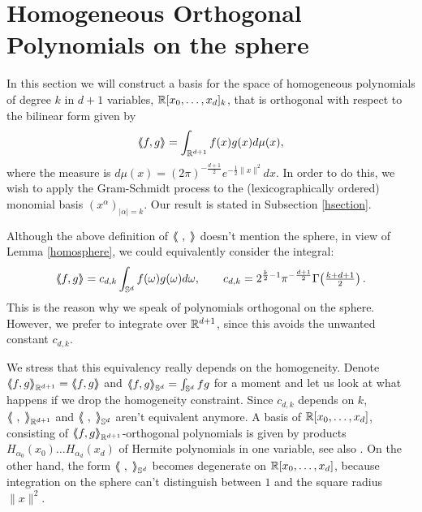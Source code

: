 \section{Homogeneous Orthogonal Polynomials on the sphere} \label{polynomialSection}
In this section we will construct a basis for the space of homogeneous polynomials of degree $k$ in $d+1$ variables, $\mathbb{R}[x_0,\ldots,x_d]_k$, that is orthogonal with respect to the bilinear form given by
\begin{equation} \label{spherebracket}
 \left<\!\!\!\:\left< f,g\right>\!\!\!\:\right> = \int_{\mathbb{R}^{d+1}}f(x)g(x) d\mu(x),
\end{equation}
where the measure is $d\mu(x) = (2\pi)^{-\frac{d+1}{2}}e^{-\frac{1}{2}\|x\|^2}dx$. In order to do this, we wish to apply the Gram-Schmidt process to the (lexicographically ordered) monomial basis $(x^\alpha)_{|\alpha |=k}$. Our result is stated in Subsection \ref{hsection}. 
\begin{remark}
Although the above definition of $\bra\ ,\;\ket$ doesn't mention the sphere, in view of Lemma \ref{homosphere}, we could equivalently consider the integral:
$$
 \left<\!\!\!\:\left< f,g\right>\!\!\!\:\right> = c_{d,k} \int_{\mathbb{S}^{d}}f(\omega)g(\omega) d\omega, \qquad c_{d,k} = 2^{\frac{k}{2}-1}\pi^{-\frac{d+1}{2}}\Gamma\!\left(\tfrac{k+d+1}{2}\right).
$$ 
This is the reason why we speak of polynomials orthogonal on the sphere. However, we prefer to integrate over $\mathbb{R}^{d+1}$, since this avoids the unwanted constant $c_{d,k}$.
\end{remark}

\begin{remark}\label{hermite}
We stress that this equivalency really depends on the homogeneity. Denote $\bra f ,g\ket_{\R^{d+1}} = \bra f,g\ket$ and $\left<\!\!\!\:\left< f ,g\right>\!\!\!\:\right>_{\mathbb{S}^{d}}=\int_{\mathbb{S}^{d}} f g$ for a moment and let us look at what happens if we drop the homogeneity constraint. Since $c_{d,k}$ depends on $k$, $\left<\!\!\!\:\left<\ ,\;\right>\!\!\!\:\right>_{\mathbb{R}^{d+1}}$ and $\left<\!\!\!\:\left<\ ,\;\right>\!\!\!\:\right>_{\mathbb{S}^d}$ aren't equivalent anymore. A basis of $\mathbb{R}[x_0,\ldots,x_d]$, consisting of $\left<\!\!\!\:\left< f ,g\right>\!\!\!\:\right>_{\mathbb{R}^{d+1}}$-orthogonal polynomials is given by products $H_{\alpha_0}\!(x_0)\ldots H_{\alpha_d}\!(x_d)$ of Hermite polynomials in one variable, see also \cite[Sect.~2.3.4]{Dunkl}. On the other hand, the form $\left<\!\!\!\:\left<\ ,\;\right>\!\!\!\:\right>_{\mathbb{S}^d}$ becomes degenerate on $\mathbb{R}[x_0,\ldots,x_d]$, because integration on the sphere can't distinguish between $1$ and the square radius $\|x\|^2$. 
\end{remark}

